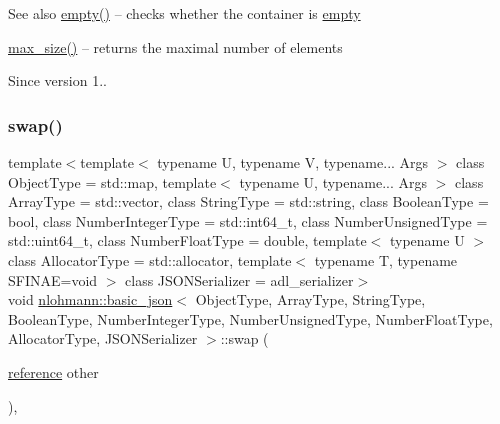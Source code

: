 \begin{DoxySeeAlso}{See also}
\mbox{\hyperlink{classnlohmann_1_1basic__json_a1a86d444bfeaa9518d2421aedd74444a}{empty()}} -- checks whether the container is \mbox{\hyperlink{classnlohmann_1_1basic__json_a1a86d444bfeaa9518d2421aedd74444a}{empty}} 

\mbox{\hyperlink{classnlohmann_1_1basic__json_a2f47d3c6a441c57dd2be00449fbb88e1}{max\+\_\+size()}} -- returns the maximal number of elements
\end{DoxySeeAlso}
\begin{DoxySince}{Since}
version 1.. 
\end{DoxySince}
\mbox{\label{classnlohmann_1_1basic__json_a8c9d932353e1ab98a7dc2fc27e002031}} 
\subsubsection{\texorpdfstring{swap()}{swap()}\hspace{0.1cm}{\footnotesize\ttfamily [1/4]}}
{\footnotesize\ttfamily template$<$template$<$ typename U, typename V, typename... Args $>$ class Object\+Type = std\+::map, template$<$ typename U, typename... Args $>$ class Array\+Type = std\+::vector, class String\+Type  = std\+::string, class Boolean\+Type  = bool, class Number\+Integer\+Type  = std\+::int64\+\_\+t, class Number\+Unsigned\+Type  = std\+::uint64\+\_\+t, class Number\+Float\+Type  = double, template$<$ typename U $>$ class Allocator\+Type = std\+::allocator, template$<$ typename T, typename S\+F\+I\+N\+A\+E=void $>$ class J\+S\+O\+N\+Serializer = adl\+\_\+serializer$>$ \\
void \mbox{\hyperlink{classnlohmann_1_1basic__json}{nlohmann\+::basic\+\_\+json}}$<$ Object\+Type, Array\+Type, String\+Type, Boolean\+Type, Number\+Integer\+Type, Number\+Unsigned\+Type, Number\+Float\+Type, Allocator\+Type, J\+S\+O\+N\+Serializer $>$\+::swap (\begin{DoxyParamCaption}\item[{\mbox{\hyperlink{classnlohmann_1_1basic__json_ac6a5eddd156c776ac75ff54cfe54a5bc}{reference}}}]{other }\end{DoxyParamCaption})\hspace{0.3cm}{\ttfamily [inline]}, {\ttfamily [noexcept]}}




